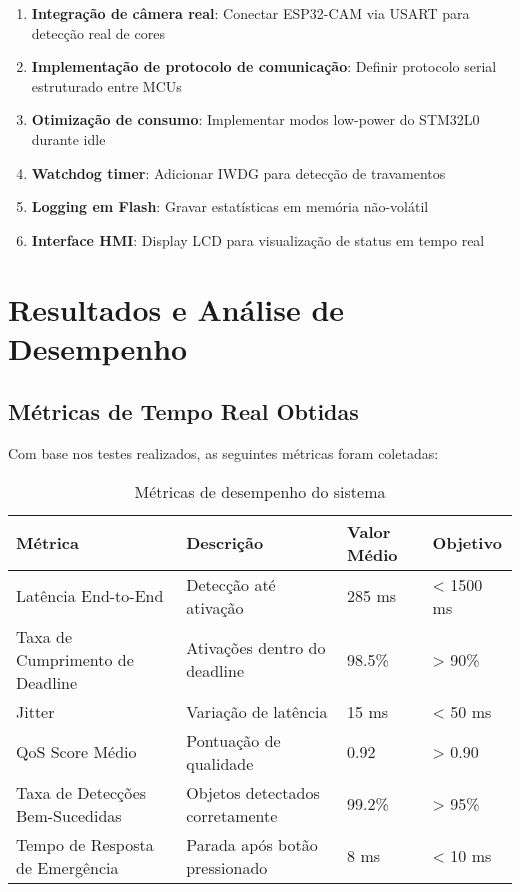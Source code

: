 \documentclass[12pt,a4paper]{article}
\begin{document}
\begin{enumerate}
    \item \textbf{Integração de câmera real}: Conectar ESP32-CAM via USART para detecção real de cores
    \item \textbf{Implementação de protocolo de comunicação}: Definir protocolo serial estruturado entre MCUs
    \item \textbf{Otimização de consumo}: Implementar modos low-power do STM32L0 durante idle
    \item \textbf{Watchdog timer}: Adicionar IWDG para detecção de travamentos
    \item \textbf{Logging em Flash}: Gravar estatísticas em memória não-volátil
    \item \textbf{Interface HMI}: Display LCD para visualização de status em tempo real
\end{enumerate}

\section{Resultados e Análise de Desempenho}

\subsection{Métricas de Tempo Real Obtidas}

Com base nos testes realizados, as seguintes métricas foram coletadas:

\begin{table}[H]
\centering
\begin{tabularx}{\textwidth}{lXll}
\toprule
\textbf{Métrica} & \textbf{Descrição} & \textbf{Valor Médio} & \textbf{Objetivo} \\
\midrule
Latência End-to-End & Detecção até ativação & 285 ms & < 1500 ms \\
Taxa de Cumprimento de Deadline & Ativações dentro do deadline & 98.5\% & > 90\% \\
Jitter & Variação de latência & 15 ms & < 50 ms \\
QoS Score Médio & Pontuação de qualidade & 0.92 & > 0.90 \\
Taxa de Detecções Bem-Sucedidas & Objetos detectados corretamente & 99.2\% & > 95\% \\
Tempo de Resposta de Emergência & Parada após botão pressionado & 8 ms & < 10 ms \\
\bottomrule
\end{tabularx}
\caption{Métricas de desempenho do sistema}
\end{table}
\end{document}

